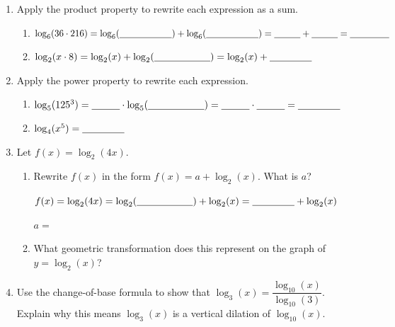 \documentclass[10pt]{article}
\begin{document}
\namedateperiod

\vspace{0.1in}

\begin{enumerate}[leftmargin=1.8em, itemsep=14pt]

\item Apply the product property to rewrite each expression as a sum.

\begin{enumerate}[leftmargin=1.5em, itemsep=6pt, label=\alph*.]
  \item $\log_6(36 \cdot 216) = \log_6(\blank{2cm}) + \log_6(\blank{2cm}) = \blank{1cm} + \blank{1cm} = \blank{1.5cm}$

  \item $\log_2(x \cdot 8) = \log_2(x) + \log_2(\blank{2cm}) = \log_2(x) + \blank{1.5cm}$
\end{enumerate}

\item Apply the power property to rewrite each expression.

\begin{enumerate}[leftmargin=1.5em, itemsep=6pt, label=\alph*.]
  \item $\log_5(125^3) = \blank{1cm} \cdot \log_5(\blank{2cm}) = \blank{1cm} \cdot \blank{1cm} = \blank{1.5cm}$

  \item $\log_4(x^5) = \blank{1.5cm}$
\end{enumerate}

\item Let $f(x) = \log_2(4x)$.

\begin{enumerate}[leftmargin=1.5em, itemsep=6pt, label=\alph*.]
  \item Rewrite $f(x)$ in the form $f(x) = a + \log_2(x)$. What is $a$?

  \vspace{4pt}
  $f(x) = \log_2(4x) = \log_2(\blank{2cm}) + \log_2(x) = \blank{1.5cm} + \log_2(x)$

  \vspace{2pt}
  $a = $ \blank{2cm}

  \item What geometric transformation does this represent on the graph of $y = \log_2(x)$?

  \writeline
\end{enumerate}

\item Use the change-of-base formula to show that $\log_3(x) = \dfrac{\log_{10}(x)}{\log_{10}(3)}$.
      Explain why this means $\log_3(x)$ is a vertical dilation of $\log_{10}(x)$.


\end{enumerate}
\end{document}
